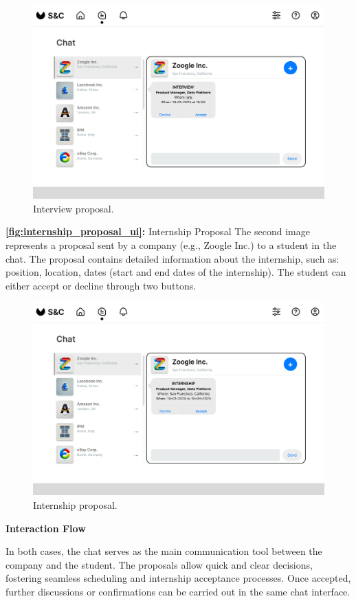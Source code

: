 \begin{figure}[H]
    \centering
    \includegraphics[width=0.75\linewidth]{DD/Images/UI/Chatpage_proposalInteview_student.png}
    \caption{Interview proposal.}
    \label{fig:interview_proposal_ui}
\end{figure}

\newpage

\textbf{\autoref{fig:internship_proposal_ui}:} Internship Proposal
The second image represents a proposal sent by a company (e.g., Zoogle Inc.) to a student in the chat. The proposal contains detailed information about the internship, such as: position, location, dates (start and end dates of the internship).
The student can either accept or decline through two buttons.

\begin{figure}[H]
    \centering
    \includegraphics[width=0.75\linewidth]{DD/Images/UI/Chatpage_proposalInternship_student.png}
    \caption{Internship proposal.}
    \label{fig:internship_proposal_ui}
\end{figure}


\textbf{Interaction Flow}

In both cases, the chat serves as the main communication tool between the company and the student. The proposals allow quick and clear decisions, fostering seamless scheduling and internship acceptance processes. Once accepted, further discussions or confirmations can be carried out in the same chat interface.